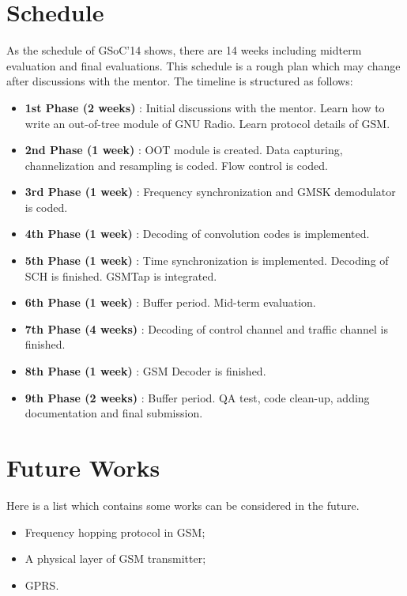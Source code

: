 \documentclass[a4paper,12pt,oneside]{article}
\begin{document}
\section{Schedule}
As the schedule of GSoC'14 shows, there are 14 weeks including midterm evaluation and final evaluations. This schedule is a rough plan which may change after discussions with the mentor. The timeline is structured as follows:
\begin{itemize}
\item \textbf{1st Phase (2 weeks)} : Initial discussions with the mentor. Learn how to write an out-of-tree module of GNU Radio. Learn protocol details of GSM.
\item \textbf{2nd Phase (1 week)} : OOT module is created. Data capturing, channelization and resampling is coded. Flow control is coded.
\item \textbf{3rd Phase (1 week)} : Frequency synchronization and GMSK demodulator is coded.
\item \textbf{4th Phase (1 week)} : Decoding of convolution codes is implemented.
\item \textbf{5th Phase (1 week)} : Time synchronization is implemented. Decoding of SCH is finished. GSMTap is integrated.
\item \textbf{6th Phase (1 week)} : Buffer period. Mid-term evaluation. 
\item \textbf{7th Phase (4 weeks)} : Decoding of control channel and traffic channel is finished.
\item \textbf{8th Phase (1 week)} : GSM Decoder is finished.
\item \textbf{9th Phase (2 weeks)} : Buffer period. QA test, code clean-up, adding documentation and final submission.

\end{itemize}
\section{Future Works}
Here is a list which contains some works can be considered in the future.

\begin{itemize}
\item Frequency hopping protocol in GSM;
\item A physical layer of GSM transmitter;
\item GPRS.
\end{itemize}
\end{document}
